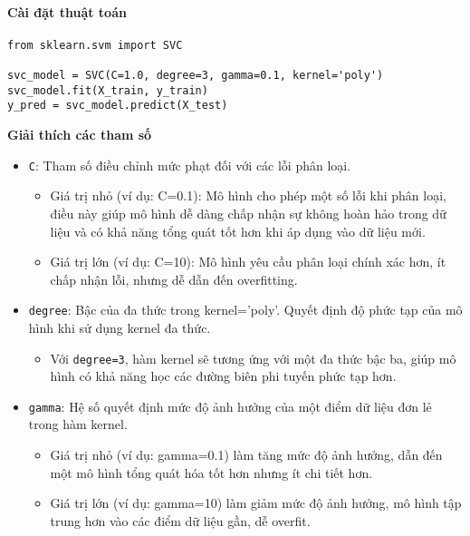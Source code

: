 \documentclass[a4paper,12pt]{article}
\begin{document}
\paragraph{Cài đặt thuật toán}

\begin{verbatim}
from sklearn.svm import SVC

svc_model = SVC(C=1.0, degree=3, gamma=0.1, kernel='poly')
svc_model.fit(X_train, y_train)
y_pred = svc_model.predict(X_test)
\end{verbatim}

\noindent \textbf{Giải thích các tham số}
\begin{itemize}
    \item \texttt{C}: Tham số điều chỉnh mức phạt đối với các lỗi phân loại.
    \begin{itemize}
        \item Giá trị nhỏ (ví dụ: C=0.1): Mô hình cho phép một số lỗi khi phân loại, điều này giúp mô hình dễ dàng chấp nhận sự không hoàn hảo trong dữ liệu và có khả năng tổng quát tốt hơn khi áp dụng vào dữ liệu mới.
        \item Giá trị lớn (ví dụ: C=10): Mô hình yêu cầu phân loại chính xác hơn, ít chấp nhận lỗi, nhưng dễ dẫn đến overfitting.
    \end{itemize}

    \item \texttt{degree}: Bậc của đa thức trong kernel='poly'. Quyết định độ phức tạp của mô hình khi sử dụng kernel đa thức.
    \begin{itemize}
        \item Với \texttt{degree=3}, hàm kernel sẽ tương ứng với một đa thức bậc ba, giúp mô hình có khả năng học các đường biên phi tuyến phức tạp hơn.
    \end{itemize}

    \item \texttt{gamma}: Hệ số quyết định mức độ ảnh hưởng của một điểm dữ liệu đơn lẻ trong hàm kernel.
    \begin{itemize}
        \item Giá trị nhỏ (ví dụ: gamma=0.1) làm tăng mức độ ảnh hưởng, dẫn đến một mô hình tổng quát hóa tốt hơn nhưng ít chi tiết hơn.
        \item Giá trị lớn (ví dụ: gamma=10) làm giảm mức độ ảnh hưởng, mô hình tập trung hơn vào các điểm dữ liệu gần, dễ overfit.
    \end{itemize}


\end{itemize}
\end{document}
